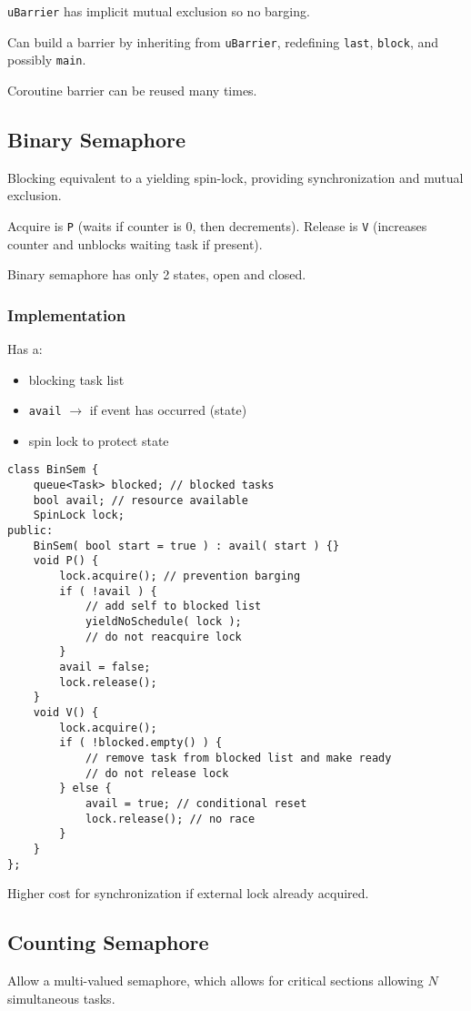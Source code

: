 \documentclass[11pt]{article}
\begin{document}
\texttt{uBarrier} has implicit mutual exclusion so no barging.

Can build a barrier by inheriting from \texttt{uBarrier}, redefining \texttt{last}, \texttt{block},
and possibly \texttt{main}.

Coroutine barrier can be reused many times.
\subsection{Binary Semaphore}
\label{sec:orgf6f719d}
Blocking equivalent to a yielding spin-lock, providing synchronization and mutual exclusion.

Acquire is \texttt{P} (waits if counter is 0, then decrements).
Release is \texttt{V} (increases counter and unblocks waiting task if present).

Binary semaphore has only 2 states, open and closed.
\subsubsection{Implementation}
\label{sec:org5b2bdf4}
Has a:
\begin{itemize}
\item blocking task list
\item \texttt{avail} \(\to\) if event has occurred (state)
\item spin lock to protect state
\end{itemize}

\begin{verbatim}
class BinSem {
    queue<Task> blocked; // blocked tasks
    bool avail; // resource available
    SpinLock lock;
public:
    BinSem( bool start = true ) : avail( start ) {}
    void P() {
        lock.acquire(); // prevention barging
        if ( !avail ) {
            // add self to blocked list
            yieldNoSchedule( lock );
            // do not reacquire lock
        }
        avail = false;
        lock.release();
    }
    void V() {
        lock.acquire();
        if ( !blocked.empty() ) {
            // remove task from blocked list and make ready
            // do not release lock
        } else {
            avail = true; // conditional reset
            lock.release(); // no race
        }
    }
};
\end{verbatim}

Higher cost for synchronization if external lock already acquired.
\subsection{Counting Semaphore}
\label{sec:org8cf7cac}
Allow a multi-valued semaphore, which allows for critical sections allowing \(N\) simultaneous tasks.
\end{document}

